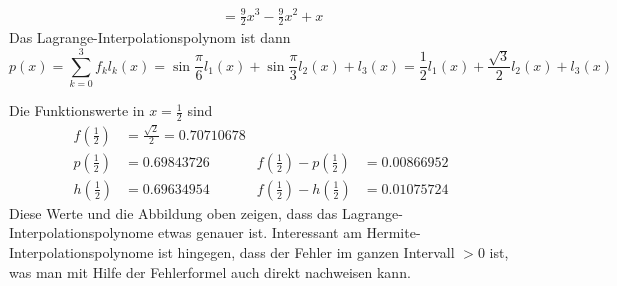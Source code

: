\begin{loesung}
\begin{teilaufgaben}
\begin{align*}
&&=\frac92x^3-\frac92x^2+x
\end{align*}
Das Lagrange-Interpolationspolynom ist dann
\[
p(x)
=
\sum_{k=0}^3f_k l_k(x)
=
\sin\frac{\pi}6 l_1(x)
+
\sin\frac{\pi}3 l_2(x)
+
l_3(x)
=
\frac12l_1(x)
+
\frac{\sqrt{3}}2 l_2(x)
+
l_3(x)
\]
\item
Die Funktionswerte in $x=\frac12$ sind
\begin{align*}
f({\textstyle\frac12}) &= \frac{\sqrt{2}}2 = 0.70710678
\\
p({\textstyle\frac12}) &= 0.69843726
&
f({\textstyle\frac12}) - p({\textstyle\frac12}) 
&=
0.00866952
\\
h({\textstyle\frac12}) &= 0.69634954
&
f({\textstyle\frac12}) - h({\textstyle\frac12}) 
&=
0.01075724
\end{align*}
Diese Werte und die Abbildung oben zeigen, dass das
Lagrange-Interpolationspolynome etwas genauer ist.
Interessant am Hermite-Interpolationspolynome ist hingegen, dass
der Fehler im ganzen Intervall $>0$ ist, was man mit Hilfe der
Fehlerformel auch direkt nachweisen kann.
\qedhere
\end{teilaufgaben}
\end{loesung}

